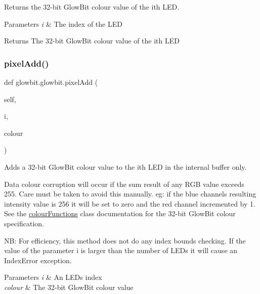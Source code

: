 Returns the 32-\/bit Glow\+Bit colour value of the i\textquotesingle{}th L\+ED. 


\begin{DoxyParams}{Parameters}
{\em i} & The index of the L\+ED \\
\hline
\end{DoxyParams}
\begin{DoxyReturn}{Returns}
The 32-\/bit Glow\+Bit colour value of the i\textquotesingle{}th L\+ED 
\end{DoxyReturn}
\mbox{\label{classglowbit_1_1glowbit_a8bb7ba36b4b7746f215ebad1acc0f5e2}} 
\subsubsection{\texorpdfstring{pixel\+Add()}{pixelAdd()}}
{\footnotesize\ttfamily def glowbit.\+glowbit.\+pixel\+Add (\begin{DoxyParamCaption}\item[{}]{self,  }\item[{}]{i,  }\item[{}]{colour }\end{DoxyParamCaption})}



Adds a 32-\/bit Glow\+Bit colour value to the i\textquotesingle{}th L\+ED in the internal buffer only. 

Data colour corruption will occur if the sum result of any R\+GB value exceeds 255. Care must be taken to avoid this manually. eg\+: if the blue channel\textquotesingle{}s resulting intensity value is 256 it will be set to zero and the red channel incremented by 1. See the \hyperlink{classglowbit_1_1colourFunctions}{colour\+Functions} class documentation for the 32-\/bit Glow\+Bit colour specification.

NB\+: For efficiency, this method does not do any index bounds checking. If the value of the parameter i is larger than the number of L\+E\+Ds it will cause an Index\+Error exception.


\begin{DoxyParams}{Parameters}
{\em i} & An L\+ED\textquotesingle{}s index \\
\hline
{\em colour} & The 32-\/bit Glow\+Bit colour value \\
\hline
\end{DoxyParams}
\mbox{\label{classglowbit_1_1glowbit_a0db675789faef3399ffb2c1213c12048}} 
